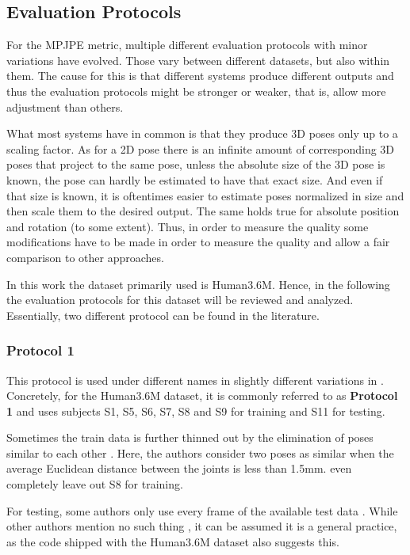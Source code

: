 \subsection{Evaluation Protocols}

For the MPJPE metric, multiple different evaluation protocols with minor variations have evolved.
Those vary between different datasets, but also within them.
The cause for this is that different systems produce different outputs and thus the evaluation protocols might be stronger or weaker, that is, allow more adjustment than others.

What most systems have in common is that they produce 3D poses only up to a scaling factor.
As for a 2D pose there is an infinite amount of corresponding 3D poses that project to the same pose, unless the absolute size of the 3D pose is known, the pose can hardly be estimated to have that exact size.
And even if that size is known, it is oftentimes easier to estimate poses normalized in size and then scale them to the desired output.
The same holds true for absolute position and rotation (to some extent).
Thus, in order to measure the quality some modifications have to be made in order to measure the quality and allow a fair comparison to other approaches.

In this work the dataset primarily used is Human3.6M.
Hence, in the following the evaluation protocols for this dataset will be reviewed and analyzed.
Essentially, two different protocol can be found in the literature.

\subsubsection{Protocol 1}

This protocol is used under different names in slightly different variations in \cite{sun17, drover18, moreno-noguer16, yasin16, kostrikov14, tome17}.
Concretely, for the Human3.6M dataset, it is commonly referred to as \textbf{Protocol 1} and uses subjects S1, S5, S6, S7, S8 and S9 for training and S11 for testing.

Sometimes the train data is further thinned out by the elimination of poses similar to each other \cite{yasin16}.
Here, the authors consider two poses as similar when the average Euclidean distance between the joints is less than 1.5mm.
\citet{drover18} even completely leave out S8 for training.

For testing, some authors only use every  frame of the available test data \cite{sun17, chen17, yasin16, moreno-noguer16, tome17}.
While other authors mention no such thing \cite{drover18, kostrikov14}, it can be assumed it is a general practice, as the code shipped with the Human3.6M dataset also suggests this.

